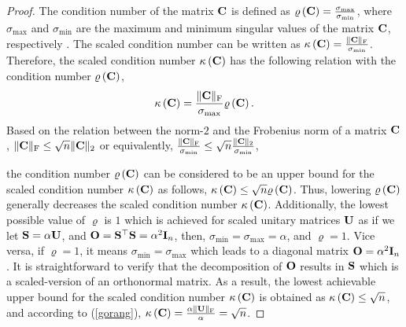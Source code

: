 \documentclass[12pt,draftcls,onecolumn]{IEEEtran}
\begin{document}
\begin{proof}
The condition number of the matrix $\mathbf{C}$ is defined as $\varrho\left(\mathbf{C}\right)=\frac{\sigma_{\mathrm{max}}}{\sigma_{\mathrm{min}}}$, where $\sigma_{\mathrm{max}}$ and $\sigma_{\mathrm{min}}$ are the maximum and minimum singular values of the matrix $\mathbf{C}$, respectively \cite{van1996matrix}. The scaled condition number can be written as $\kappa\left(\mathbf{C}\right)=\frac{\|\mathbf{C}\|_{\mathrm{F}}}{\sigma_{\mathrm{min}}}$. Therefore, the scaled condition number $\kappa\left(\mathbf{C}\right)$ has the following relation with the condition number $\varrho\left(\mathbf{C}\right)$,
\begin{equation}
\label{gorang}
\kappa\left(\mbC\right)=\frac{\|\mbC\|_{\mathrm{F}}}{\sigma_{\mathrm{max}}}\varrho\left(\mbC\right). 
\end{equation}\normalsize
Based on the relation between the norm-$2$ and the Frobenius norm of a matrix $\mathbf{C}$ \cite{van1996matrix}, $\|\mathbf{C}\|_{\mathrm{F}}\leq \sqrt{n}  \|\mathbf{C}\|_{\mathrm{2}}$ or equivalently, $\frac{\|\mathbf{C}\|_{\mathrm{F}}}{\sigma_{\mathrm{min}}} \leq \sqrt{n} \frac{\|\mathbf{C}\|_{\mathrm{2}}}{\sigma_{\mathrm{min}}}$,

the condition number $\varrho\left(\mathbf{C}\right)$ can be considered to be an upper bound for the scaled condition number $\kappa\left(\mathbf{C}\right)$ as follows,
$\kappa\left(\mathbf{C}\right)\leq \sqrt{n} \varrho\left(\mathbf{C}\right)$.
Thus, lowering $\varrho\left(\mathbf{C}\right)$ generally decreases the scaled condition number $\kappa\left(\mathbf{C}\right)$. Additionally,
the lowest possible value of $\varrho$ is $1$ which is achieved for scaled unitary matrices $\mathbf{U}$ as if we let $\mathbf{S}=\alpha \mathbf{U}$, and $\mathbf{O}=\mathbf{S}^{\top}\mathbf{S}=\alpha^{2}\mathbf{I}_{n}$, then, $\sigma_{\mathrm{min}}=\sigma_{\mathrm{max}}=\alpha$, and $\varrho=1$. Vice versa, if $\varrho=1$, it means $\sigma_{\mathrm{min}}=\sigma_{\mathrm{max}}$ which leads to a diagonal matrix $\mathbf{O}=\alpha^{2}\mathbf{I}_{n}$. It is straightforward to verify that the decomposition of $\mathbf{O}$ results in $\mathbf{S}$ which is a scaled-version of an orthonormal matrix. As a result, the lowest achievable upper bound for the scaled condition number $\kappa\left(\mathbf{C}\right)$ is obtained as $\kappa\left(\mathbf{C}\right)\leq \sqrt{n}$, and according to (\ref{gorang}), $ \kappa\left(\mathbf{C}\right)=\frac{\alpha\|\mathbf{U}\|_{\mathrm{F}}}{\alpha}=\sqrt{n}$. 
\end{proof}
\end{document}
